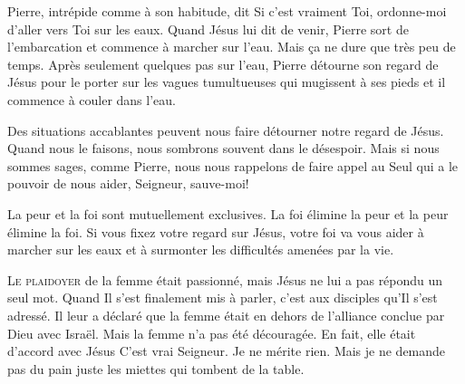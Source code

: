 
Pierre, intrépide  comme à son habitude, dit\frcolon{} 
 \Og Si c'est vraiment Toi, ordonne-moi d'aller vers Toi sur les eaux. \Fg{}
 Quand Jésus lui dit de venir, Pierre sort de l'embarcation et commence
 à marcher sur l'eau. Mais \c{c}a ne dure que très peu de temps.
 Après seulement quelques pas sur l'eau, Pierre détourne son  regard
 de Jésus pour le porter sur les vagues tumultueuses qui mugissent à ses pieds
 \ocadr {} et il commence à couler dans l'eau. 

Des situations accablantes peuvent nous faire détourner notre regard de Jésus.
 Quand nous le faisons, nous sombrons souvent dans le désespoir.
 Mais si nous sommes sages, comme Pierre, nous nous rappelons
 de faire appel au Seul qui a le pouvoir de nous aider,
 \Og Seigneur, sauve-moi! \Fg{}

La peur et la foi sont mutuellement exclusives. La foi élimine la peur
 et la peur élimine la foi. Si vous fixez votre regard sur Jésus,
 votre foi va vous aider à marcher sur les eaux et à surmonter
 les difficultés amenées par la vie. 

\dvrule







\lettrine{L}{e plaidoyer} de la femme était passionné,
 mais Jésus ne lui a pas répondu un seul mot.
 Quand Il s'est finalement mis à parler, c'est aux disciples
 qu'Il s'est adressé. Il leur a déclaré que la femme était en dehors
 de l'alliance conclue par Dieu avec Israël.
 Mais la femme n'a pas été découragée.
 En fait, elle était d'accord avec Jésus\frcolon{}
 \Og C'est vrai Seigneur. Je ne mérite rien.
 Mais je ne demande pas du pain
 \ocadr juste les miettes qui tombent de la table. \Fg{}

